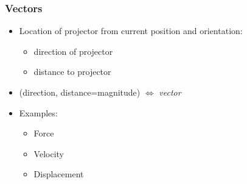 \begin{frame}
 \frametitle{Vectors}

\begin{itemize}
 \item Location of projector from current position and orientation:

\pause
\begin{itemize}
  \item direction of projector
  \item distance to projector
\end{itemize}

\pause
\item (direction, distance=magnitude) $\Longleftrightarrow$ \textit{vector}

\pause
\item Examples:
\begin{itemize}
  \item Force
  \item Velocity
  \item Displacement
\end{itemize}
\end{itemize}

\end{frame}